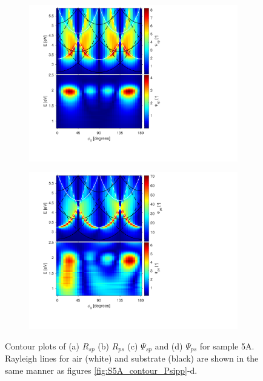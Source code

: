 \begin{figure}[h!]
    \begin{subfigure}{0.5\textwidth}
        \centering
        \includegraphics[width=\linewidth, trim=1.1cm  1.8cm 6.7cm 0cm, clip]{figures/ch4/S5A/contour/S5A_Psisp.pdf}
        \caption{}
    \end{subfigure}
    \begin{subfigure}{0.5\textwidth}
        \centering
        \includegraphics[width=\linewidth, trim=1.1cm  1.8cm 6.7cm 0cm, clip]{figures/ch4/S5A/contour/S5A_Psips.pdf}
        \caption{}
    \end{subfigure}
    \caption{Contour plots of (a) $R_{sp}$ (b) $R_{ps}$ (c) $\Psi_{sp}$ and (d) $\Psi_{ps}$ for sample 5A. Rayleigh lines for air (white) and substrate (black) are shown in the same manner as figures \ref{fig:S5A_contour_Psipp}-d.}
    \label{fig:S5A_contour_Psips&Psisp}
\end{figure}



